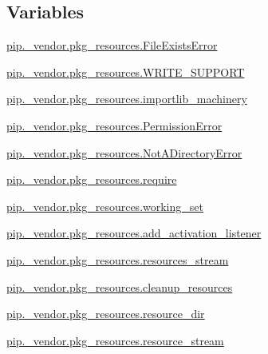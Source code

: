 \subsection*{Variables}
\begin{DoxyCompactItemize}
\item 
\hyperlink{namespacepip_1_1__vendor_1_1pkg__resources_a04e3fd90bf4dd79a0e7bcd6ed5a8fd0a}{pip.\+\_\+vendor.\+pkg\+\_\+resources.\+File\+Exists\+Error}
\item 
\hyperlink{namespacepip_1_1__vendor_1_1pkg__resources_abff150c441b99af7668ea9d2dd585710}{pip.\+\_\+vendor.\+pkg\+\_\+resources.\+W\+R\+I\+T\+E\+\_\+\+S\+U\+P\+P\+O\+RT}
\item 
\hyperlink{namespacepip_1_1__vendor_1_1pkg__resources_acc7842adb00bd45983535f053f203e04}{pip.\+\_\+vendor.\+pkg\+\_\+resources.\+importlib\+\_\+machinery}
\item 
\hyperlink{namespacepip_1_1__vendor_1_1pkg__resources_a82e782b8ae601ec6b29ab63ad3530723}{pip.\+\_\+vendor.\+pkg\+\_\+resources.\+Permission\+Error}
\item 
\hyperlink{namespacepip_1_1__vendor_1_1pkg__resources_a4e796e96a32e813f1a4f1de3ec701669}{pip.\+\_\+vendor.\+pkg\+\_\+resources.\+Not\+A\+Directory\+Error}
\item 
\hyperlink{namespacepip_1_1__vendor_1_1pkg__resources_ad0f72942fbe9e7ab6e8a6441fa6925de}{pip.\+\_\+vendor.\+pkg\+\_\+resources.\+require}
\item 
\hyperlink{namespacepip_1_1__vendor_1_1pkg__resources_a4ec3e8a6e90c36881e417fb7aa6783cf}{pip.\+\_\+vendor.\+pkg\+\_\+resources.\+working\+\_\+set}
\item 
\hyperlink{namespacepip_1_1__vendor_1_1pkg__resources_a5c7d3f7c5967101a9f4f1ab900b111c1}{pip.\+\_\+vendor.\+pkg\+\_\+resources.\+add\+\_\+activation\+\_\+listener}
\item 
\hyperlink{namespacepip_1_1__vendor_1_1pkg__resources_a2ac8e2ff0c513936d5765a32574f69b3}{pip.\+\_\+vendor.\+pkg\+\_\+resources.\+resources\+\_\+stream}
\item 
\hyperlink{namespacepip_1_1__vendor_1_1pkg__resources_a79395dc05f5dc16506c0f3fcbdffbe85}{pip.\+\_\+vendor.\+pkg\+\_\+resources.\+cleanup\+\_\+resources}
\item 
\hyperlink{namespacepip_1_1__vendor_1_1pkg__resources_afcb37803b7d24ac745825e39f4331521}{pip.\+\_\+vendor.\+pkg\+\_\+resources.\+resource\+\_\+dir}
\item 
\hyperlink{namespacepip_1_1__vendor_1_1pkg__resources_ac9b280b3f4218147a15eb376679fc9a2}{pip.\+\_\+vendor.\+pkg\+\_\+resources.\+resource\+\_\+stream}

\end{DoxyCompactItemize}
